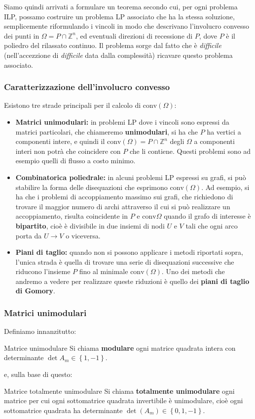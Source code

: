 \documentclass[a4paper,11pt]{article}
\begin{document}
Siamo quindi arrivati a formulare un teorema secondo cui, per ogni problema ILP, possamo costruire un problema LP associato che ha la stessa soluzione, semplicemente riformulando i vincoli in modo che descrivano l'involucro convesso dei punti in $\Omega = P \cap \mathbb{Z}^n$, ed eventuali direzioni di recessione di $P$, dove $P$ è il poliedro del rilassato continuo.
Il problema sorge dal fatto che è \textit{difficile} (nell'accezzione di \textit{difficile} data dalla complessità) ricavare questo problema associato.

\subsubsection{Caratterizzazione dell'involucro convesso}
Esistono tre strade principali per il calcolo di $\mathrm{conv}(\Omega)$:
\begin{itemize}
	\item \textbf{Matrici unimodulari:} in problemi LP dove i vincoli sono espressi da matrici particolari, che chiameremo \textbf{unimodulari}, si ha che $P$ ha vertici a componenti intere, e quindi il $\mathrm{conv}(\Omega) = P \cap \mathbb{Z}^n$ degli $\Omega$ a componenti interi non potrà che coincidere con $P$ che li contiene. Questi problemi sono ad esempio quelli di flusso a costo minimo.
	\item \textbf{Combinatorica poliedrale:} in alcuni problemi LP espressi su grafi, si può stabilire la forma delle disequazioni che esprimono $\mathrm{conv}(\Omega)$. Ad esempio, si ha che i problemi di accoppiamento massimo sui grafi, che richiedono di trovare il maggior numero di archi attraverso il cui si può realizzare un accoppiamento, risulta coincidente in $P$ e $\mathrm{conv}{\Omega}$ quando il grafo di interesse è \textbf{bipartito}, cioè è divisibile in due insiemi di nodi $U$ e $V$ tali che ogni arco porta da $U \rightarrow V$ o viceversa.
	\item \textbf{Piani di taglio:} quando non si possono applicare i metodi riportati sopra, l'unica strada è quella di trovare una serie di disequazioni successive che riducono l'insieme $P$ fino al minimale $\mathrm{conv}(\Omega)$.
		Uno dei metodi che andremo a vedere per realizzare queste riduzioni è quello dei \textbf{piani di taglio di Gomory}.
\end{itemize}

\subsubsection{Matrici unimodulari}
Definiamo innanzitutto:
\begin{definition}{Matrice unimodulare}
	Si chiama \textbf{modulare} ogni matrice quadrata intera con determinante $\det{A_{m}} \in \left\{ 1, -1\right\}$.
\end{definition}
e, sulla base di questo:
\begin{definition}{Matrice totalmente unimodulare}
	Si chiama \textbf{totalmente unimodulare} ogni matrice per cui ogni sottomatrice quadrata invertibile è unimodulare, cioè ogni sottomatrice quadrata ha determinante $\det(A_{m}) \in \left\{0, 1, -1\right\}$.
\end{definition}
\end{document}
